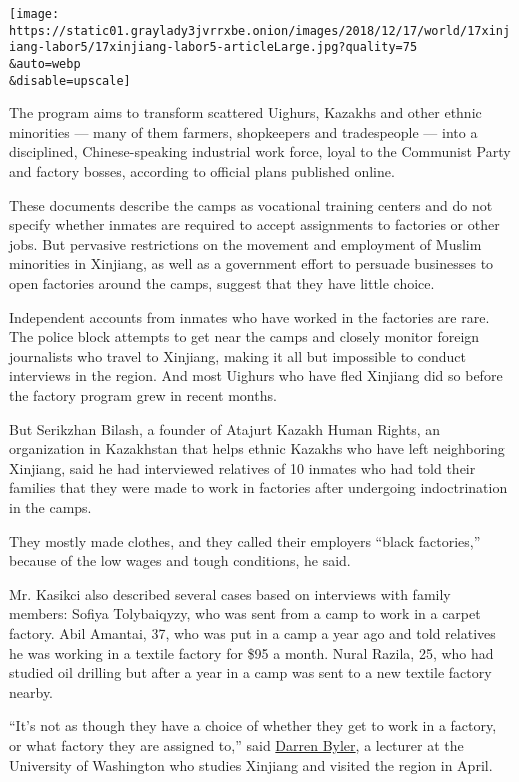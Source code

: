 \texttt{[image: https://static01.graylady3jvrrxbe.onion/images/2018/12/17/world/17xinjiang-labor5/17xinjiang-labor5-articleLarge.jpg?quality=75\\\&auto=webp\\\&disable=upscale]}

The program aims to transform scattered Uighurs, Kazakhs and other
ethnic minorities --- many of them farmers, shopkeepers and tradespeople
--- into a disciplined, Chinese-speaking industrial work force, loyal to
the Communist Party and factory bosses, according to official plans
published online.

These documents describe the camps as vocational training centers and do
not specify whether inmates are required to accept assignments to
factories or other jobs. But pervasive restrictions on the movement and
employment of Muslim minorities in Xinjiang, as well as a government
effort to persuade businesses to open factories around the camps,
suggest that they have little choice.

Independent accounts from inmates who have worked in the factories are
rare. The police block attempts to get near the camps and closely
monitor foreign journalists who travel to Xinjiang, making it all but
impossible to conduct interviews in the region. And most Uighurs who
have fled Xinjiang did so before the factory program grew in recent
months.

But Serikzhan Bilash, a founder of Atajurt Kazakh Human Rights, an
organization in Kazakhstan that helps ethnic Kazakhs who have left
neighboring Xinjiang, said he had interviewed relatives of 10 inmates
who had told their families that they were made to work in factories
after undergoing indoctrination in the camps.

They mostly made clothes, and they called their employers ``black
factories,'' because of the low wages and tough conditions, he said.

Mr. Kasikci also described several cases based on interviews with family
members: Sofiya Tolybaiqyzy, who was sent from a camp to work in a
carpet factory. Abil Amantai, 37, who was put in a camp a year ago and
told relatives he was working in a textile factory for \$95 a month.
Nural Razila, 25, who had studied oil drilling but after a year in a
camp was sent to a new textile factory nearby.

``It's not as though they have a choice of whether they get to work in a
factory, or what factory they are assigned to,'' said
\href{https://anthropology.washington.edu/people/darren-byler}{Darren
Byler}, a lecturer at the University of Washington who studies Xinjiang
and visited the region in April.

